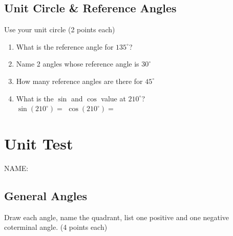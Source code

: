 \documentclass[12pt]{article}
\begin{document}
\subsection*{Unit Circle \& Reference Angles}

Use your unit circle (2 points each)\\

\begin{enumerate}[resume]

\item What is the reference angle for $135^\circ$?\\

\item Name 2 angles whose reference angle is $30^\circ$\\

\item How many reference angles are there for $45^\circ$\\

\item What is the $\sin$ and $\cos$ value at $210^\circ$?\\

$\sin(210^\circ)=$ \hspace{1in} $\cos(210^\circ)=$

\end{enumerate}

\section*{Unit Test}

\hfill NAME:\underline{\hspace*{3in}}

\subsection*{General Angles}

Draw each angle, name the quadrant, list one positive and one negative coterminal angle. (4 points each)\\
\end{document}
